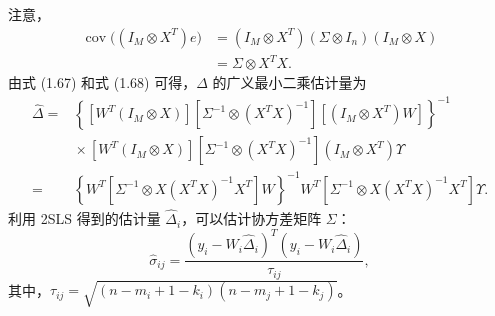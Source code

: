 注意，
\begin{equation}
 \begin{aligned}
 \operatorname{cov}\bigl((I_M\otimes X^{T})e\bigr)
  &=(I_M\otimes X^{T})(\Sigma\otimes I_n)(I_M\otimes X)\\
  &=\Sigma\otimes X^{T}X.
 \end{aligned}
 \tag{1.68}
\end{equation}
由式 (1.67) 和式 (1.68) 可得，$\Delta$ 的广义最小二乘估计量为
\begin{equation}
 \begin{aligned}
 \widehat\Delta
 ={}&\left\{
       [W^{T}(I_M\otimes X)]
       [\Sigma^{-1}\otimes(X^{T}X)^{-1}]
       [(I_M\otimes X^{T})W]\right\}^{-1}\\
    &{}\times[W^{T}(I_M\otimes X)]
       [\Sigma^{-1}\otimes(X^{T}X)^{-1}]
       (I_M\otimes X^{T})\Upsilon\\
 ={}&\left\{W^{T}
       [\Sigma^{-1}\otimes X(X^{T}X)^{-1}X^{T}]W\right\}^{-1}
       W^{T}[\Sigma^{-1}\otimes X(X^{T}X)^{-1}X^{T}]\Upsilon.
 \end{aligned}
 \tag{1.69}
\end{equation}
利用 2SLS 得到的估计量 $\widehat\Delta_i$，可以估计协方差矩阵 $\Sigma$：
\begin{equation}
 \widehat\sigma_{ij}
  =\frac{(y_i-W_i\widehat\Delta_i)^{T}
          (y_i-W_i\widehat\Delta_i)}{\tau_{ij}},
 \tag{1.70}
\end{equation}
其中，$\tau_{ij}=\sqrt{(n-m_i+1-k_i)(n-m_j+1-k_j)}$。

